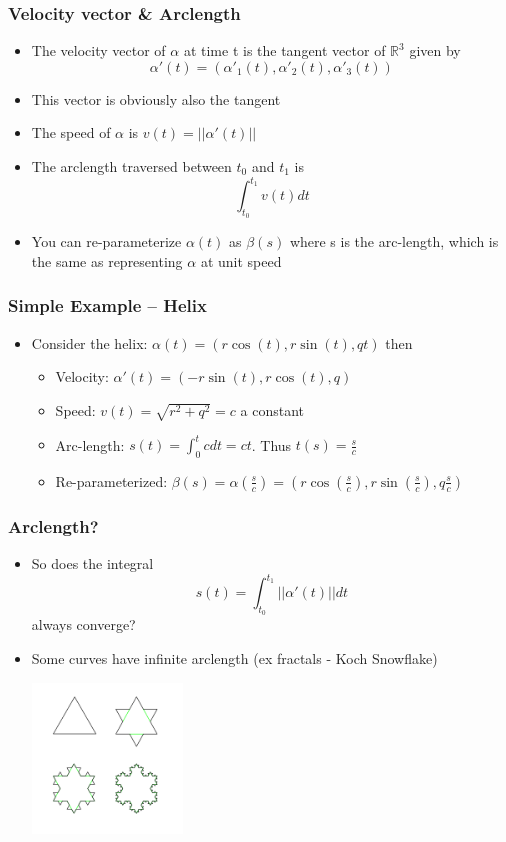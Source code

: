 \documentclass[10pt]{beamer}
\begin{document}
\begin{frame}
  \frametitle{Velocity vector \& Arclength}
  \begin{itemize}
  \item The velocity vector of $\alpha$ at time t is the tangent vector of $\mathbb{R}^3$ given by
    \[ \alpha'(t) = ( \alpha'_1(t), \alpha'_2(t), \alpha'_3(t)) \]
  \item This vector is obviously also the tangent
  \item The speed of $\alpha$ is $v(t) = ||\alpha'(t)||$
  \item The arclength traversed between $t_0$ and $t_1$ is
    \[
      \int_{t_0}^{t_1} v(t) dt
    \]
  \item You can re-parameterize $\alpha (t)$ as $\beta (s)$ where s is
    the arc-length, which is the same as representing $\alpha$ at unit
    speed
  \end{itemize}
\end{frame}

\begin{frame}
  \frametitle{Simple Example --  Helix}
  \begin{itemize}
  \item Consider the helix: $\alpha(t) = ( r \cos(t), r \sin(t), q t )$ then
    \begin{itemize}
    \item Velocity: $\alpha'(t) = ( - r \sin (t), r \cos (t), q)$
    \item Speed: $ v(t) = \sqrt{ r^2 + q^2 } = c$ a constant
    \item Arc-length: $s(t) = \int_0^t c dt = ct$. Thus $t(s) = \frac{s}{c}$
    \item Re-parameterized: $\beta(s) = \alpha(\frac{s}{c}) = (r \cos (\frac{s}{c}), r \sin(\frac{s}{c}), q \frac{s}{c})$
    \end{itemize}
  \end{itemize}
\end{frame}

\begin{frame}
  \frametitle{Arclength?}
  \begin{itemize}
  \item So does the integral
    \[
      s(t) = \int_{t_0}^{t_1} ||\alpha'(t)|| dt
    \]
    always converge? \pause
  \item Some curves have infinite arclength (ex fractals - Koch Snowflake) 
    \centerline{\includegraphics[height=4cm]{koch-flake}}
  \end{itemize}
\end{frame}
\end{document}
